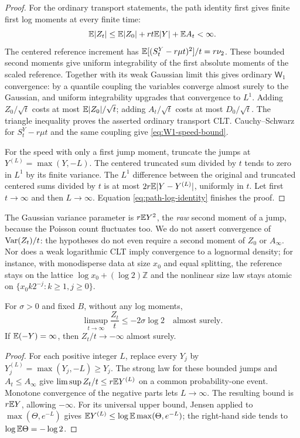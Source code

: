 \begin{proof}
For the ordinary transport statements, the path identity first gives
finite first log moments at every finite time:
\begin{equation}
 \mathbb E|Z_t|\leq\mathbb E|Z_0|+rt\mathbb E|Y|+\mathbb E A_t<\infty.
 \label{eq:log-integrability}
\end{equation}
The centered reference increment has
$\mathbb E[(S_t^Y-r\mu t)^2]/t=r\nu_2$. These bounded second moments
give uniform integrability of the first absolute moments of the
scaled reference. Together with its weak Gaussian limit this gives
ordinary $\mathsf W_1$ convergence: by a quantile coupling the variables
converge almost surely to the Gaussian, and uniform integrability
upgrades that convergence to $L^1$. Adding $Z_0/\sqrt t$ costs at
most $\mathbb E|Z_0|/\sqrt t$; adding $A_t/\sqrt t$ costs at most
$D_0/\sqrt t$. The triangle inequality proves the asserted ordinary
transport CLT. Cauchy--Schwarz for $S_t^Y-r\mu t$ and the same
coupling give \eqref{eq:W1-speed-bound}.

For the speed with only a first jump moment, truncate the jumps at
$Y^{(L)}=\max(Y,-L)$. The centered truncated sum divided by $t$
tends to zero in $L^1$ by its finite variance. The $L^1$ difference
between the original and truncated centered sums divided by $t$
is at most $2r\mathbb E|Y-Y^{(L)}|$, uniformly in $t$. Let first
$t\to\infty$ and then $L\to\infty$. Equation
\eqref{eq:path-log-identity} finishes the proof.
\end{proof}

The Gaussian variance parameter is $r\mathbb E Y^2$, the \emph{raw} second
moment of a jump, because the Poisson count fluctuates too. We do not
assert convergence of $\operatorname{Var}(Z_t)/t$: the hypotheses do not even
require a second moment of $Z_0$ or $A_\infty$. Nor does a weak
logarithmic CLT imply convergence to a lognormal density; for
instance, with monodisperse data at size $x_0$ and equal splitting,
the reference stays on the lattice $\log x_0+(\log2)\mathbb Z$ and
the nonlinear size law stays atomic on $\{x_0k2^{-j}:k\geq1,j\geq0\}$.

\begin{corollary}\label{cor:infinite-log-speed}
For $\sigma>0$ and fixed $B$, without any log moments,
\[
 \limsup_{t\to\infty}\frac{Z_t}{t}\leq-2\sigma\log2
 \quad\text{almost surely}.
\]
If $\mathbb E(-Y)=\infty$, then $Z_t/t\to-\infty$ almost surely.
\end{corollary}

\begin{proof}
For each positive integer $L$, replace every $Y_j$ by
$Y_j^{(L)}=\max(Y_j,-L)\geq Y_j$. The strong law for these bounded
jumps and $A_t\leq A_\infty$ give
$\limsup Z_t/t\leq r\mathbb E Y^{(L)}$ on a common probability-one event.
Monotone convergence of the negative parts lets $L\to\infty$.
The resulting bound is $r\mathbb E Y$, allowing $-\infty$.
For its universal upper bound, Jensen applied to
$\max(\Theta,e^{-L})$ gives
$\mathbb E Y^{(L)}\leq\log\mathbb E\max(\Theta,e^{-L})$; the right-hand side
tends to $\log\mathbb E\Theta=-\log2$.
\end{proof}

